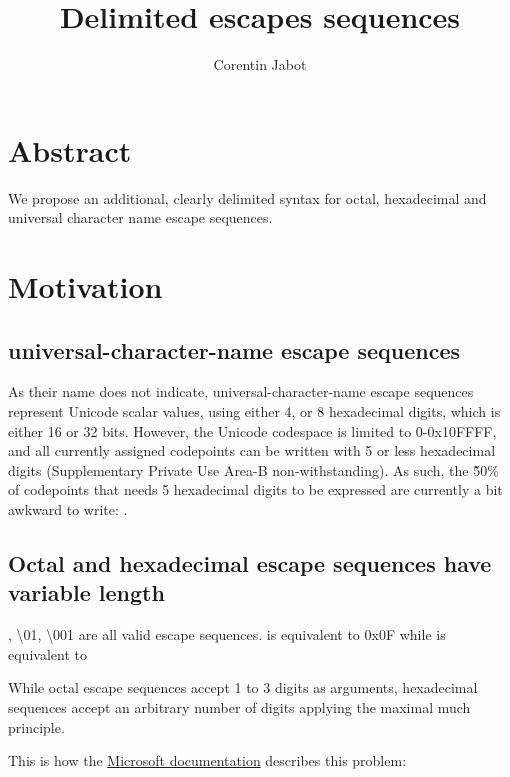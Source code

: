 \documentclass{wg21}
\title{Delimited escapes sequences}
\author{Corentin Jabot}{corentin.jabot@gmail.com}
\begin{document}
    \maketitle
    
    \paperquote{}
    
    \section{Abstract}
    
    We propose an additional, clearly delimited syntax for octal, hexadecimal and universal character name escape sequences.
    
    
    \section{Motivation}
    
    \subsection{universal-character-name escape sequences}
    
    As their name does not indicate, universal-character-name escape sequences represent Unicode scalar values,
    using either 4, or 8 hexadecimal digits, which is either 16 or 32 bits.
    However, the Unicode codespace is limited to 0-0x10FFFF, and all currently assigned codepoints can be written with 5 or less
    hexadecimal digits (Supplementary Private Use Area-B non-withstanding).
    As such, the \~50\% of codepoints that needs 5 hexadecimal digits to be expressed are currently a bit awkward to write: .
    
    \subsection{Octal and hexadecimal escape sequences have variable length}
    
    , {\textbackslash 01}, {\textbackslash 001} are all valid escape sequences.
     is equivalent to 0x0F while  is equivalent to 
    
    While octal escape sequences accept 1 to 3 digits as arguments, hexadecimal sequences accept an arbitrary number of digits
    applying the maximal much principle.
    
    
    This is how the \href{https://docs.microsoft.com/en-us/cpp/c-language/octal-and-hexadecimal-character-specifications?view=msvc-160}{Microsoft documentation} describes this problem:
    
\end{document}
